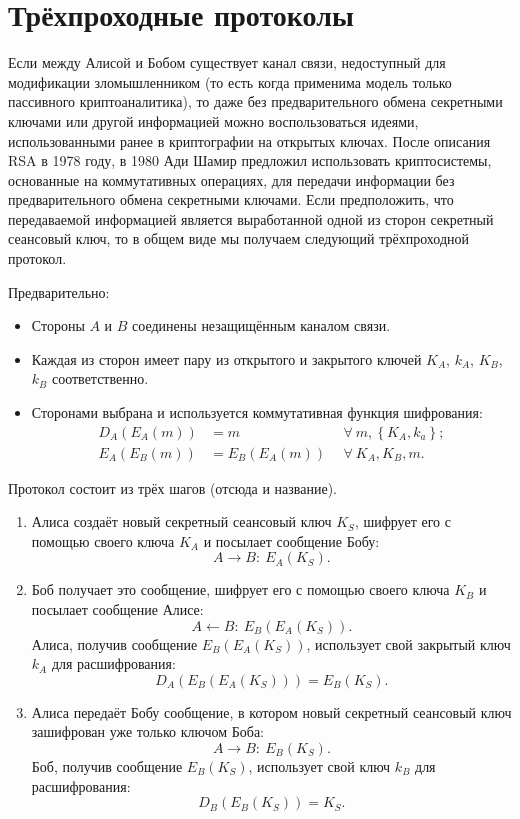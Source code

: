 \section{Трёхпроходные протоколы}

Если между Алисой и Бобом существует канал связи, недоступный для модификации зломышленником (то есть когда применима модель только пассивного криптоаналитика), то даже без предварительного обмена секретными ключами или другой информацией можно воспользоваться идеями, использованными ранее в криптографии на открытых ключах. После описания RSA в 1978 году, в 1980 Ади Шамир предложил использовать криптосистемы, основанные на коммутативных операциях, для передачи информации без предварительного обмена секретными ключами. Если предположить, что передаваемой информацией является выработанной одной из сторон секретный сеансовый ключ, то в общем виде мы получаем следующий трёхпроходной протокол.

Предварительно:

\begin{itemize}
	\item Стороны $A$ и $B$ соединены незащищённым каналом связи.
	\item Каждая из сторон имеет пару из открытого и закрытого ключей $K_A$, $k_A$, $K_B$, $k_B$ соответственно.
	\item Сторонами выбрана и используется коммутативная функция шифрования:
	\begin{align*}
		D_{A} \left( E_{A} \left( m \right) \right)	&= m		& ~~\forall ~ m, \left\{ K_A, k_a \right\}; \\
		E_{A} \left( E_{B} \left( m \right) \right)	&= E_B \left( E_A \left( m \right) \right) & ~~\forall ~ K_A, K_B, m.
	\end{align*}
\end{itemize}

Протокол состоит из трёх шагов (отсюда и название).
\begin{enumerate}
    \item Алиса создаёт новый секретный сеансовый ключ $K_S$, шифрует его с помощью своего ключа $K_A$ и посылает сообщение Бобу:
        \[ A \rightarrow B: ~ E_A \left( K_S \right). \]
    \item Боб получает это сообщение, шифрует его с помощью своего ключа $K_B$ и посылает сообщение Алисе:
        \[ A \leftarrow B: ~ E_B \left( E_A \left( K_S \right) \right). \]
    Алиса, получив сообщение $E_B \left( E_A \left( K_S \right) \right)$, использует свой закрытый ключ $k_A$ для расшифрования:
            \[ D_A \left( E_B \left( E_A \left( K_S \right) \right) \right) = E_B \left( K_S \right). \]
    \item Алиса передаёт Бобу сообщение, в котором новый секретный сеансовый ключ зашифрован уже только ключом Боба:
        \[ A \rightarrow B: ~ E_B \left( K_S \right). \]
    Боб, получив сообщение $E_B \left( K_S \right)$, использует свой ключ $k_B$ для расшифрования:
            \[ D_B \left( E_B \left( K_S \right) \right) = K_S. \]
\end{enumerate}


